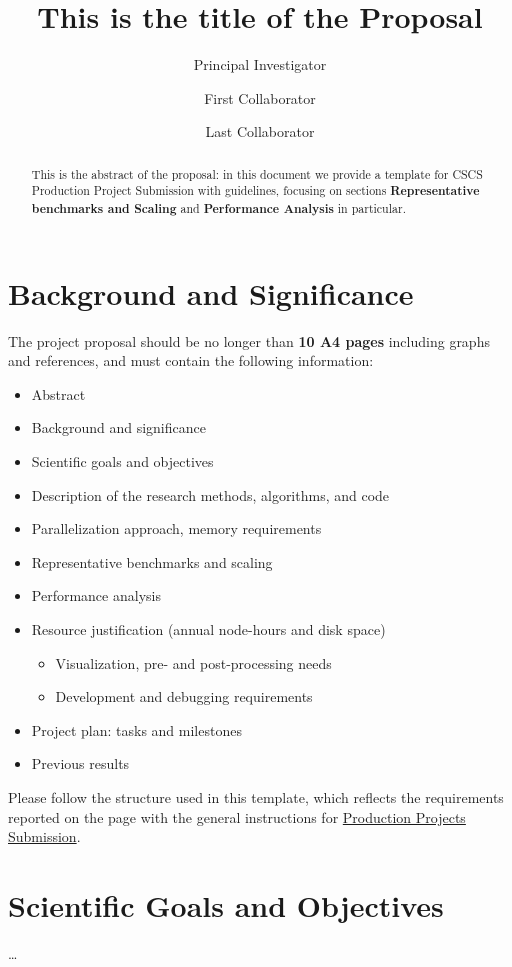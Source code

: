 \documentclass[11pt]{article}
\title{This is the title of the Proposal}
\author[1]{Principal Investigator}
\author[2]{First Collaborator}
\author[1,2]{Last Collaborator}
\affil[1]{Affiliation of the PI}
\affil[2]{Other affiliation}
\date{}
\begin{document}
\maketitle

\begin{abstract}
 This is the abstract of the proposal: in this document we provide a template for CSCS Production Project Submission with guidelines, 
focusing on sections \textbf{Representative benchmarks and Scaling} and \textbf{Performance Analysis} in particular.
\end{abstract}

\section{Background and Significance}
The project proposal should be no longer than \textbf{10 A4 pages} including graphs and references, and must contain the following information:
\begin{itemize}
 \item Abstract
 \item Background and significance
 \item Scientific goals and objectives
 \item Description of the research methods, algorithms, and code
 \item Parallelization approach, memory requirements
 \item Representative benchmarks and scaling
 \item Performance analysis
 \item Resource justification (annual node-hours and disk space)
 \begin{itemize}
  \item Visualization, pre- and post-processing needs
  \item Development and debugging requirements
 \end{itemize}
 \item Project plan: tasks and milestones
 \item Previous results 
\end{itemize}
Please follow the structure used in this template, which reflects the requirements reported on the page with the general instructions for \href{http://www.cscs.ch/user_lab/allocation_schemes/submission100/index.html}{Production Projects Submission}. 

\section{Scientific Goals and Objectives}
\ldots 
\end{document}
